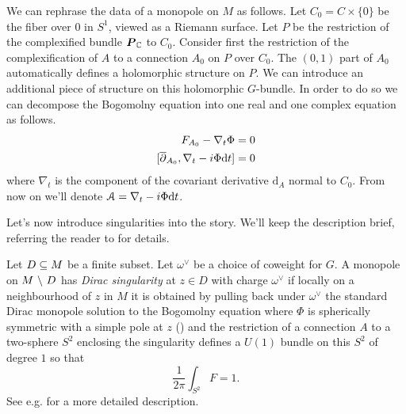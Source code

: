\documentclass[10pt, oneside]{article}
\renewcommand{\d}{\mathrm{d}}
\begin{document}
 

We can rephrase the data of a monopole on $M$ as follows.  Let $C_0 = C \times \{0\}$ be the fiber over $0$ in $S^1$, viewed as a Riemann surface.  Let $P$ be the restriction of the complexified bundle $\boldsymbol{P}_{\mathbb{C}}$ to $C_0$.  Consider first the restriction of the complexification of $A$ to a connection $A_0$ on $P$ over $C_0$.  The $(0,1)$ part of $A_0$ automatically defines a holomorphic structure on $P$.  We can introduce an additional piece of structure on this holomorphic $G$-bundle.  In order to do so we can decompose the Bogomolny equation into one real and one complex equation as follows.
\begin{align*}
F_{A_0} - \nabla_t \Phi &= 0 \\
[\ol{\del}_{A_0}, \nabla_t - i\Phi \d t] &= 0 
\end{align*}
where $\nabla_t$ is the component of the covariant derivative $\d_A$ normal to $C_0$.  From now on we'll denote $\mc A = \nabla_t - i\Phi \d t$.

Let's now introduce singularities into the story.  We'll keep the description brief, referring the reader to \cite{CharbonneauHurtubise, Smith} for details.
\begin{definition}
  Let $D \subseteq M$ be a finite subset.  Let $\omega^\vee$ be a choice of coweight for $G$.  A monopole on $M \ \backslash \  D$ has \emph{Dirac singularity} at $z \in D$ with charge $\omega^\vee$ if locally on a neighbourhood of $z$ in $M$ it is obtained by pulling back under $\omega^\vee$ the standard Dirac monopole solution to the Bogomolny equation where $\Phi$ is spherically symmetric with a simple pole at $z$ () and the restriction of a connection $A$ to a two-sphere $S^2$ enclosing the singularity defines a $U(1)$ bundle on this $S^2$ of degree $1$ so that
    \[
     \frac{1}{2\pi} \int_{S^2} F = 1 .
    \]
  See e.g. \cite[Section 2.2]{CharbonneauHurtubise} for a more detailed description.
\end{definition}
\end{document}
